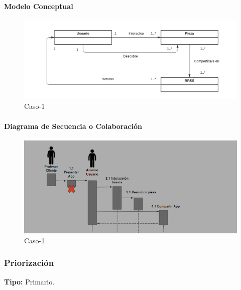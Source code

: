 \paragraph{Modelo Conceptual}

\begin{figure}[H]
\centerline{\includegraphics[width=15cm]{imgs/ModeloConceptualCaso_1_3.png}}
\caption{Caso-1}
\label{fig}
\end{figure}

\paragraph{Diagrama de Secuencia o Colaboración}

\begin{figure}[H]
\centerline{\includegraphics[width=15cm]{imgs/CasoUso_1_2.PNG}}
\caption{Caso-1}
\label{fig}
\end{figure}

\subsubsection{Priorización}
{\textbf {Tipo:}}
Primario.